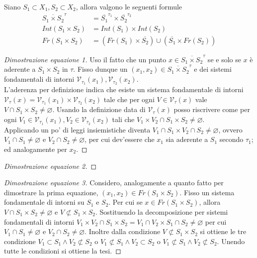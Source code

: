 \begin{theorem}
	Siano $S_1 \subset X_1, S_2 \subset X_2$, allora valgono le seguenti formule
	\begin{align}
		\overline{S_1\times S_2}^{\tau} & = \overline{S_1}^{\tau_1} \times \overline{S_2}^{\tau_2} \\
		Int(S_1 \times S_2) & = Int(S_1) \times Int(S_2)\\
		Fr(S_1 \times S_2) &= (Fr(S_1) \times \overline{S_2}) \cup (\overline{S_1} \times Fr(S_2))
	\end{align}
\end{theorem}
\begin{proof}[Dimostrazione equazione 1]
	Uso il fatto che un punto $x \in \overline{S_1\times S_2}^\tau$ se e solo se $x$ è aderente a $S_1 \times S_2$ in $\tau$. Fisso dunque un $(x_1, x_2) \in \overline{S_1\times S_2}^\tau$ e dei sistemi fondamentali di intorni $\mathcal{V}_{\tau_1}(x_1), \mathcal{V}_{\tau_2}(x_2)$.\\
	L'aderenza per definizione indica che esiste un sistema fondamentale di intorni $\mathcal{V}_\tau(x) = \mathcal{V}_{\tau_1}(x_1) \times \mathcal{V}_{\tau_2}(x_2)$ tale che per ogni $V \in \mathcal{V}_\tau(x)$ vale $V \cap S_1 \times S_2 \neq \varnothing$. Usando la definizione data di $\mathcal{V}_\tau(x)$ posso riscrivere come per ogni $V_1 \in \mathcal{V}_{\tau_1}(x_1), V_2 \in \mathcal{V}_{\tau_2}(x_2)$ tali che $V_1 \times V_2 \cap S_1 \times S_2 \neq \varnothing$. \\ 
	Applicando un po' di leggi insiemistiche diventa $V_1 \cap S_1 \times V_2 \cap S_2 \neq \varnothing$, ovvero $V_1 \cap S_1 \neq \varnothing$ e $V_2 \cap S_2\neq \varnothing$, per cui dev'essere che $x_1$ sia aderente a $S_1$ secondo $\tau_1$; ed analogamente per $x_2$. 
\end{proof}
\begin{proof}[Dimostrazione equazione 2]
\end{proof}
\begin{proof}[Dimostrazione equazione 3]
	Considero, analogamente a quanto fatto per dimostrare la prima equazione, $(x_1,x_2) \in Fr(S_1 \times S_2)$. Fisso un sistema fondamentale di intorni su $S_1$ e $S_2$. Per cui se $x \in Fr(S_1 \times S_2)$, allora $V \cap S_1 \times S_2\neq \varnothing$ e $V \not\subset S_1 \times S_2$. Sostituendo la decomposizione per sistemi fondamentali di intorni $V_1 \times V_2 \cap S_1 \times S_2 = V_1 \cap V_2 \times S_1 \cap S_2\neq \varnothing$ per cui $V_1 \cap S_1 \neq \varnothing$ e $V_2 \cap S_2 \neq \varnothing$. Inoltre dalla condizione $V \not\subset S_1 \times S_2$ si ottiene le tre condizione $V_1 \subset S_1 \land V_2 \not\subset S_2$ o $V_1 \not\subset S_1 \land V_2 \subset S_2$ o $V_1 \not\subset S_1 \land V_2 \not\subset S_2$. Unendo tutte le condizioni si ottiene la tesi. 
\end{proof}

